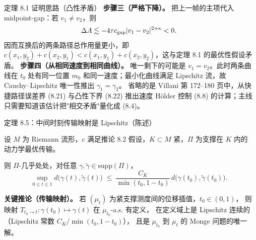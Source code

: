 \begin{frame}{定理 8.1 证明思路（凸性矛盾）}
  \textbf{步骤三（严格下降）。}\proofskipnote
  把上一帧的主项代入 midpoint-gap：若 $v_{1}\ne v_{2}$，则
  \[
    \Delta A
    \lesssim -4\tau c_{\mathrm{gap}}\lvert v_{1}-v_{2}\rvert^{2+\kappa}<0.
  \]
  因而互换后的两条路径总作用量更小，即
  $c(x_{1},y_{2})+c(x_{2},y_{1})<c(x_{1},y_{1})+c(x_{2},y_{2})$，这与定理 8.1 的最优性假设矛盾。
  \textbf{步骤四（从相同速度到相同曲线）。}
  唯一剩下的可能是 $v_{1}=v_{2}$。此时两条曲线在 $t_{0}$ 处有同一位置 $m_{0}$ 和同一速度；最小化曲线满足 Lipschitz 流，故 Cauchy--Lipschitz 唯一性推出 $\gamma_{1}=\gamma_{2}$。
  省略的是 Villani 第 172--180 页中，从快捷路径误差界 (8.21) 与凸性下界 (8.22) 推出速度 Hölder 控制 (8.8) 的计算；主线只需要知道该估计把"相交矛盾"量化成 (8.4)。
\end{frame}

\begin{frame}{定理 8.5：中间时刻传输映射是 Lipschitz（陈述）}

  设 $M$ 为 Riemann 流形，$c$ 满足推论 8.2 假设，$K\subset M$ 紧，$\Pi$ 为支撑在 $K$ 内的动力学最优传输。

  则 $\Pi$-几乎处处，对任意 $\gamma,\tilde{\gamma}\in\mathrm{supp}(\Pi)$，
  \[
    \sup_{0\le t\le 1}d\!\bigl(\gamma(t),\tilde{\gamma}(t)\bigr)
    \;\le\; \frac{C_{K}}{\min(t_{0},1-t_{0})}\,d\!\bigl(\gamma(t_{0}),\tilde{\gamma}(t_{0})\bigr).
  \]

  \textbf{关键推论（传输映射）。} 若 $(\mu_{t})$ 为紧支撑测度间的位移插值，$t_{0}\in(0,1)$，
  则映射 $T_{t_{0}\to t}\colon\gamma(t_{0})\mapsto\gamma(t)$ 在 $\mu_{t_{0}}$-a.s. 有定义，
  在定义域上是 Lipschitz 连续的（Lipschitz 常数 $C_{K}/\min(t_{0},1-t_{0})$），
  且是 $\mu_{t_{0}}$ 到 $\mu_{t}$ 的 Monge 问题的唯一解。

\end{frame}

